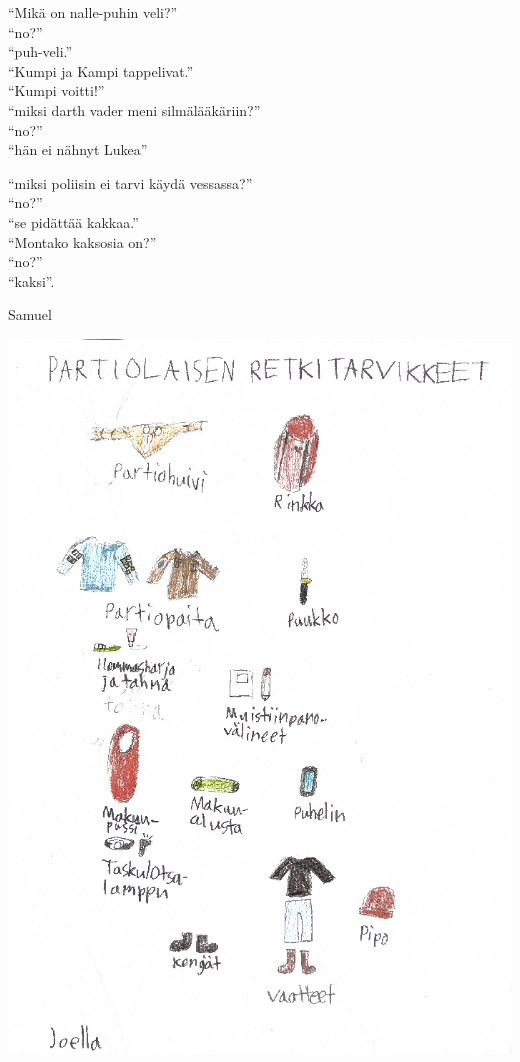 \begin{multicols}{2}
\bigskip
\noindent“Mikä on nalle-puhin veli?”\\
“no?”\\
“puh-veli.”\\

\bigskip
\noindent“Kumpi ja Kampi tappelivat.”\\
“Kumpi voitti!”\\

\bigskip
\noindent“miksi darth vader meni \mbox{silmälääkäriin}?”\\
“no?”\\
“hän ei nähnyt Lukea”\\

\columnbreak

\bigskip
\noindent“miksi poliisin ei tarvi käydä \mbox{vessassa}?”\\
“no?”\\
“se pidättää kakkaa.”\\

\bigskip
\noindent“Montako kaksosia on?”\\
“no?”\\
“kaksi”.\\
\end{multicols}


\bigskip
\noindent Samuel


\begin{center}
\noindent\includegraphics[width=1.0\textwidth,trim={0 0 0 0.5cm},clip]{assets/seikkailijat4}
\end{center}

